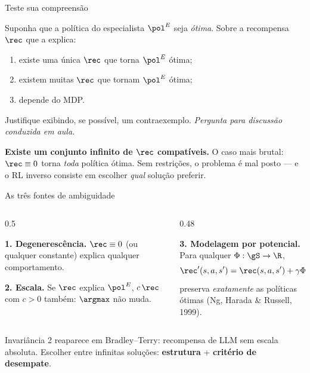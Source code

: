 \documentclass[aspectratio=169, 11pt]{beamer}
\newcommand{\paradiscussao}{\smallskip
  {\footnotesize\color{rlCinza}\itshape Pergunta para discussão conduzida em aula.}}
\newcommand{\polE}{\pol^{E}}                     %
\begin{document}
\begin{frame}[shrink]{Teste sua compreensão}

  \begin{quizbox}{}
    Suponha que a política do especialista $\polE$ seja \emph{ótima}. Sobre a
    recompensa $\rec$ que a explica:
    \begin{enumerate}\setlength{\itemsep}{0.1ex}
      \item[1.] existe uma única $\rec$ que torna $\polE$ ótima;
      \item[2.] existem muitas $\rec$ que tornam $\polE$ ótima;
      \item[3.] depende do MDP.
    \end{enumerate}
    Justifique exibindo, se possível, um contraexemplo.
    \paradiscussao
  \end{quizbox}

  \pause

  \begin{respbox}
    \textbf{Existe um conjunto infinito de $\rec$ compatíveis.} O caso mais
    brutal: $\rec \equiv 0$ torna \emph{toda} política ótima. Sem restrições, o
    problema é mal posto --- e o RL inverso consiste em escolher \emph{qual}
    solução preferir.
  \end{respbox}
\end{frame}

\begin{frame}[shrink]{As três fontes de ambiguidade}

  \begin{columns}[T]
  \begin{column}{0.5\textwidth}
    \begin{alertabox}
      \textbf{1. Degenerescência.} $\rec\equiv 0$ (ou qualquer constante)
      explica qualquer comportamento.
    \end{alertabox}
    \begin{alertabox}
      \textbf{2. Escala.} Se $\rec$ explica $\polE$, $c\,\rec$ com
      $c>0$ também: $\argmax$ não muda.
    \end{alertabox}
  \end{column}
  \begin{column}{0.48\textwidth}
    \begin{alertabox}
      \textbf{3. Modelagem por potencial.} Para qualquer $\Phi:\gS\to\R$,
      \[
        \rec'(s,a,s') = \rec(s,a,s') + \gamma\Phi(s') - \Phi(s)
      \]
      preserva \emph{exatamente} as políticas ótimas
      {\scriptsize(Ng, Harada \& Russell, 1999)}.
    \end{alertabox}
  \end{column}
  \end{columns}

  \begin{ideiabox}
    Invariância 2 reaparece em Bradley--Terry: recompensa de LLM sem escala
    absoluta. Escolher entre infinitas soluções: \textbf{estrutura} +
    \textbf{critério de desempate}.
  \end{ideiabox}
\end{frame}
\end{document}
